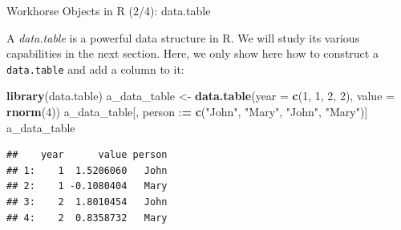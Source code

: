 \documentclass[10pt,ignorenonframetext,]{beamer}
\newenvironment{Shaded}{\begin{snugshade}}{\end{snugshade}}
\newcommand{\KeywordTok}[1]{\textcolor[rgb]{0.13,0.29,0.53}{\textbf{{#1}}}}
\newcommand{\DataTypeTok}[1]{\textcolor[rgb]{0.13,0.29,0.53}{{#1}}}
\newcommand{\DecValTok}[1]{\textcolor[rgb]{0.00,0.00,0.81}{{#1}}}
\newcommand{\StringTok}[1]{\textcolor[rgb]{0.31,0.60,0.02}{{#1}}}
\newcommand{\ErrorTok}[1]{\textcolor[rgb]{0.64,0.00,0.00}{\textbf{{#1}}}}
\newcommand{\NormalTok}[1]{{#1}}
\begin{document}
\begin{frame}[fragile]{Workhorse Objects in R (2/4): data.table}

A \emph{data.table} is a powerful data structure in R. We will study its
various capabilities in the next section. Here, we only show here how to
construct a \texttt{data.table} and add a column to it:

\footnotesize

\begin{Shaded}
\begin{Highlighting}[]
\KeywordTok{library}\NormalTok{(data.table)}
\NormalTok{a_data_table <-}\StringTok{ }\KeywordTok{data.table}\NormalTok{(}\DataTypeTok{year =} \KeywordTok{c}\NormalTok{(}\DecValTok{1}\NormalTok{, }\DecValTok{1}\NormalTok{, }\DecValTok{2}\NormalTok{, }\DecValTok{2}\NormalTok{), }\DataTypeTok{value =} \KeywordTok{rnorm}\NormalTok{(}\DecValTok{4}\NormalTok{))}
\NormalTok{a_data_table[, person :}\ErrorTok{=}\StringTok{ }\KeywordTok{c}\NormalTok{(}\StringTok{"John"}\NormalTok{, }\StringTok{"Mary"}\NormalTok{, }\StringTok{"John"}\NormalTok{, }\StringTok{"Mary"}\NormalTok{)]}
\NormalTok{a_data_table}
\end{Highlighting}
\end{Shaded}

\begin{verbatim}
##    year      value person
## 1:    1  1.5206060   John
## 2:    1 -0.1080404   Mary
## 3:    2  1.8010454   John
## 4:    2  0.8358732   Mary
\end{verbatim}

\normalsize

\end{frame}
\end{document}
